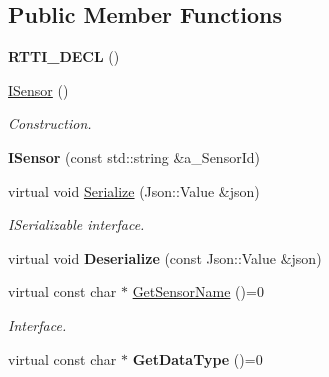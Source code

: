 \subsection*{Public Member Functions}
\begin{DoxyCompactItemize}
\item 
\mbox{\label{class_i_sensor_abc4ab755a8b770cd2b195ca942481184}} 
{\bfseries R\+T\+T\+I\+\_\+\+D\+E\+CL} ()
\item 
\mbox{\label{class_i_sensor_a76ff7396e26cd605508367325dd070ab}} 
\hyperlink{class_i_sensor_a76ff7396e26cd605508367325dd070ab}{I\+Sensor} ()
\begin{DoxyCompactList}\small\item\em Construction. \end{DoxyCompactList}\item 
\mbox{\label{class_i_sensor_ace2350133639bbfcb3135067a3e826a3}} 
{\bfseries I\+Sensor} (const std\+::string \&a\+\_\+\+Sensor\+Id)
\item 
\mbox{\label{class_i_sensor_aaedd4206c746fb4219a8bf55804706d9}} 
virtual void \hyperlink{class_i_sensor_aaedd4206c746fb4219a8bf55804706d9}{Serialize} (Json\+::\+Value \&json)
\begin{DoxyCompactList}\small\item\em I\+Serializable interface. \end{DoxyCompactList}\item 
\mbox{\label{class_i_sensor_a9141c3a58c5f0bf3f9439a400d720683}} 
virtual void {\bfseries Deserialize} (const Json\+::\+Value \&json)
\item 
\mbox{\label{class_i_sensor_a55b7ed29ecd363f63c473ecca16cad13}} 
virtual const char $\ast$ \hyperlink{class_i_sensor_a55b7ed29ecd363f63c473ecca16cad13}{Get\+Sensor\+Name} ()=0
\begin{DoxyCompactList}\small\item\em Interface. \end{DoxyCompactList}\item 
\mbox{\label{class_i_sensor_a0820de7fbe8839752b275c71eec7f488}} 
virtual const char $\ast$ {\bfseries Get\+Data\+Type} ()=0

\end{DoxyCompactItemize}
